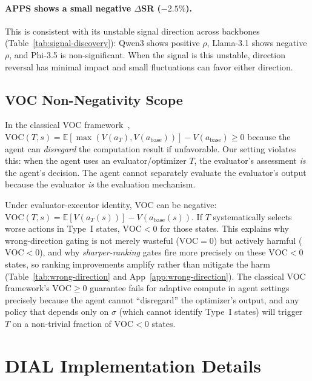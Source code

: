 \paragraph{APPS shows a small negative $\Delta$SR ($-2.5\%$).}
This is consistent with its unstable signal direction across
backbones (Table~\ref{tab:signal-discovery}): Qwen3 shows
positive $\rho$, Llama-3.1 shows negative $\rho$, and Phi-3.5 is
non-significant. When the signal is this unstable, direction
reversal has minimal impact and small fluctuations can favor
either direction.

\subsection{VOC Non-Negativity Scope}
\label{app:voc}

In the classical VOC framework~\cite{russell1991right},
$\mathrm{VOC}(T, s) =
 \mathbb{E}[\max(V(a_T), V(a_{\mathrm{base}}))]
 - V(a_{\mathrm{base}}) \geq 0$
because the agent can \emph{disregard} the computation result if
unfavorable. Our setting violates this: when the agent uses an
evaluator/optimizer $T$, the evaluator's assessment \emph{is} the
agent's decision. The agent cannot separately evaluate the
evaluator's output because the evaluator \emph{is} the evaluation
mechanism.

Under evaluator-executor identity, VOC can be negative:
$\mathrm{VOC}(T, s) =
 \mathbb{E}[V(a_T(s))] - V(a_{\mathrm{base}}(s))$.
If $T$ systematically selects worse actions in Type~I states,
$\mathrm{VOC} < 0$ for those states. This explains why
wrong-direction gating is not merely wasteful
($\mathrm{VOC} = 0$) but actively harmful
($\mathrm{VOC} < 0$), and why \emph{sharper-ranking} gates
fire more precisely on these $\mathrm{VOC} < 0$ states, so
ranking improvements amplify rather than mitigate the harm
(Table~\ref{tab:wrong-direction} and
App~\ref{app:wrong-direction}). The classical VOC framework's
$\mathrm{VOC} \geq 0$ guarantee fails for adaptive compute in
agent settings precisely because the agent cannot ``disregard''
the optimizer's output, and any policy that depends only on
$\sigma$ (which cannot identify Type~I states) will trigger
$T$ on a non-trivial fraction of $\mathrm{VOC} < 0$ states.


\section{DIAL Implementation Details}
\label{app:dial-details}

